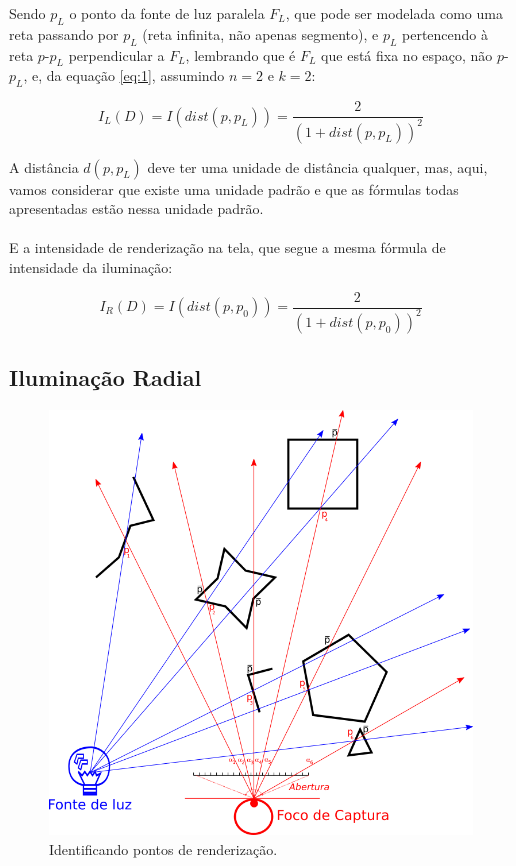 \documentclass{article}
\begin{document}
	Sendo $p_L$ o ponto da fonte de luz paralela $F_L$, que pode ser modelada como uma reta passando por $p_L$ (reta infinita, não apenas segmento), e $p_L$ pertencendo à reta $p$-$p_L$ perpendicular a $F_L$, lembrando que é $F_L$ que está fixa no espaço, não $p$-$p_L$, e, da equação \ref{eq:1}, assumindo $n = 2$ e $k = 2$:
	
	\begin{equation} \label{eq:3}
		I_L(D) = I(dist(p, p_L)) =  \frac{2}{(1+dist(p, p_L))^2}
	\end{equation}
	
	A distância $d(p, p_L)$ deve ter uma unidade de distância qualquer, mas, aqui, vamos considerar que existe uma unidade padrão e que as fórmulas todas apresentadas estão nessa unidade padrão.
	
	\paragraph{}
	E a intensidade de renderização na tela, que segue a mesma fórmula de intensidade da iluminação:
	
	\begin{equation} \label{eq:4}
		I_R(D) = I(dist(p, p_0)) = \frac{2}{(1+dist(p, p_0))^2}
	\end{equation}
	
	\subsection{Iluminação Radial}
	
	\begin{figure}[h]
		\centering
		\includegraphics[scale=0.8]{Renderizacao-2D-1D-radial}
		\caption{Identificando pontos de renderização.}
		\label{fig:rend-rad}
	\end{figure}
	
\end{document}
